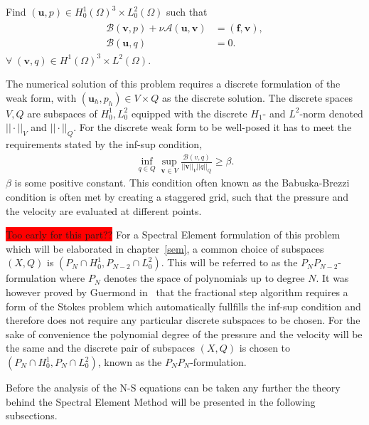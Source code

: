 Find $(\mathbf{u}, p) \in H^1_0(\Omega)^3\times L^2_0(\Omega)$ such that 
\begin{align}
    \begin{split}
           \mathcal{B}(\mathbf{v},p) 
         +\nu\mathcal{A}(\mathbf{u},\mathbf{v}) &= (\mathbf{f},\mathbf{v}), \\
        \mathcal{B}(\mathbf{u},q) &= 0.
    \end{split}
	\label{eq:NSweak}
\end{align}
$\forall\; (\mathbf{v}, q) \in H^1(\Omega)^3\times L^2(\Omega)$.
%

The numerical solution of this problem requires a discrete formulation of the weak form, with $(\mathbf{u}_h,p_h)\in V\times Q$
as the discrete solution. The discrete spaces $V,Q$ are subspaces of $H_0^1,L^2_0$ equipped with the discrete $H_1$- and $L^2$-norm
denoted $||\cdot||_V$ and $||\cdot||_Q$.
For the discrete weak form to be well-posed it has to meet the requirements stated by the inf-sup condition, 
%
\begin{align}
    \inf_{q\in Q}\sup_{\mathbf{v}\in V}\frac{\mathcal{B}(v,q)}{||\mathbf{v}||_V||q||_Q} \ge \beta.
    \label{eq:infsup}
\end{align}
%
$\beta$ is some positive constant. This condition often known as the Babuska-Brezzi condition is 
often met by creating a staggered grid, such that the pressure and the velocity are 
evaluated at different points. 

\colorbox{red}{Too early for this part??}
For a Spectral Element formulation of this problem which will be elaborated in chapter~\ref{sem},
a common choice of subspaces $(X,Q)$ is $(P_N\cap H^1_0,P_{N-2} \cap L^{2}_{0})$. This will be referred to as the 
$P_NP_{N-2}$-formulation where $P_N$ denotes the space of polynomials up to degree $N$.
It was however proved by Guermond in~\cite{GuermondPnPn} that the fractional step algorithm requires a 
form of the Stokes problem which automatically fullfills the inf-sup condition and therefore does not require any particular 
discrete subspaces to be chosen. For the sake of convenience the polynomial degree of the pressure and the velocity will be 
the same and the discrete pair of subspaces $(X,Q)$ is chosen to $(P_N\cap H^1_0,P_{N} \cap L^{2}_{0})$, known as the $P_NP_N$-formulation.

Before the analysis of the N-S equations can be taken any further the theory behind the Spectral Element Method will be presented in the following
subsections.


